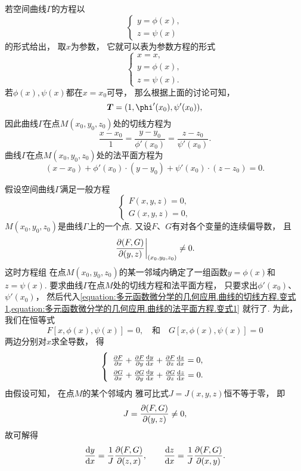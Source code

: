 若空间曲线\(\Gamma\)的方程以\[
	\left\{ \begin{array}{l}
		y = \phi(x), \\
		z = \psi(x)
	\end{array} \right.
\]的形式给出，
取\(x\)为参数，
它就可以表为参数方程的形式\[
	\left\{ \begin{array}{l}
		x = x, \\
		y = \phi(x), \\
		z = \psi(x).
	\end{array} \right.
\]
若\(\phi(x),\psi(x)\)都在\(x=x_0\)可导，
那么根据上面的讨论可知，\[
	\vb{T} = (1,\phi'(x_0),\psi'(x_0)),
\]
因此曲线\(\Gamma\)在点\(M(x_0,y_0,z_0)\)处的切线方程为
\begin{equation}\label{equation:多元函数微分学的几何应用.曲线的切线方程.变式1}
	\frac{x-x_0}{1}
	=\frac{y-y_0}{\phi'(x_0)}
	=\frac{z-z_0}{\psi'(x_0)}.
\end{equation}
曲线\(\Gamma\)在点\(M(x_0,y_0,z_0)\)处的法平面方程为
\begin{equation}\label{equation:多元函数微分学的几何应用.曲线的法平面方程.变式1}
	(x-x_0) + \phi'(x_0) \cdot (y-y_0) + \psi'(x_0) \cdot (z-z_0) = 0.
\end{equation}

假设空间曲线\(\Gamma\)满足一般方程 
\[
	\left\{ \begin{array}{l}
		F(x,y,z) = 0, \\
		G(x,y,z) = 0,
	\end{array} \right.
\]
\(M(x_0,y_0,z_0)\)是曲线\(\Gamma\)上的一个点.
又设\(F\)、\(G\)有对各个变量的连续偏导数，
且\[
	\eval{\jacobi{F,G}{y,z}}_{(x_0,y_0,z_0)} \neq 0.
\]
这时方程组 
在点\(M(x_0,y_0,z_0)\)的某一邻域内确定了一组函数\(y=\phi(x)\)和\(z=\psi(x)\).
要求曲线\(\Gamma\)在点\(M\)处的切线方程和法平面方程，
只要求出\(\phi'(x_0)\)、\(\psi'(x_0)\)，
然后代入\cref{equation:多元函数微分学的几何应用.曲线的切线方程.变式1,equation:多元函数微分学的几何应用.曲线的法平面方程.变式1} 就行了.
为此，我们在恒等式\[
	F[x,\phi(x),\psi(x)] = 0,
	\quad\text{和}\quad
	G[x,\phi(x),\psi(x)] = 0
\]两边分别对\(x\)求全导数，
得\[
	\left\{ \def\arraystretch{1.5} \begin{array}{l}
		\pdv{F}{x} + \pdv{F}{y} \dv{y}{x} + \pdv{F}{z} \dv{z}{x} = 0, \\
		\pdv{G}{x} + \pdv{G}{y} \dv{y}{x} + \pdv{G}{z} \dv{z}{x} = 0.
	\end{array} \right.
\]
由假设可知，
在点\(M\)的某个邻域内
雅可比式\(J=J(x,y,z)\)恒不等于零，
即\[
	J = \pdv{ (F,G) }{ (y,z) } \neq 0,
\]
故可解得\[
	\dv{y}{x} = \frac{1}{J} \pdv{ (F,G) }{ (z,x) },
	\qquad
	\dv{z}{x} = \frac{1}{J} \pdv{ (F,G) }{ (x,y) }.
\]

